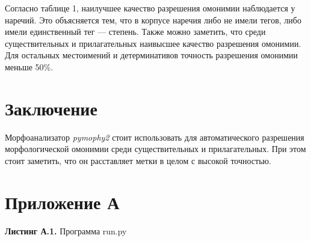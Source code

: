 \documentclass[14pt,a4paper]{extarticle}
\begin{document}
	\begin{results}
		Согласно таблице 1, наилучшее качество разрешения омонимии наблюдается у наречий. Это объясняется тем, что в корпусе наречия либо не имели тегов, либо имели единственный тег --- степень. Также можно заметить, что среди существительных и прилагательных наивысшее качество разрешения омонимии. Для остальных местоимений и детерминативов точность разрешения омонимии меньше 50\%.
	\end{results}

	\section*{Заключение}
	
	Морфоанализатор \textit{pymophy2} стоит использовать для автоматического разрешения морфологической омонимии среди существительных и прилагательных. При этом стоит заметить, что он расставляет метки в целом с высокой точностью.

	\section*{Приложение А}
	
	\centering\textbf{Листинг А.1.} Программа run.py
	
\end{document}
